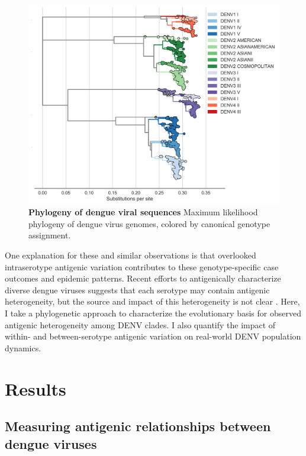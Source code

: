 \begin{figure}[ht!]
  \begin{centering}
    \includegraphics[width=\linewidth]{./png/genotype_tree.png}
  	\caption[Phylogeny of dengue viral sequences]{\textbf{Phylogeny of dengue viral sequences }
    Maximum likelihood phylogeny of dengue virus genomes, colored by canonical genotype assignment.
    }
  	\label{genotype_tree}
  \end{centering}
\end{figure}

One explanation for these and similar observations is that overlooked intraserotype antigenic variation contributes to these genotype-specific case outcomes and epidemic patterns.
Recent efforts to antigenically characterize diverse dengue viruses suggests that each serotype may contain antigenic heterogeneity, but the source and impact of this heterogeneity is not clear \citep{katzelnick2015dengue}.
Here, I take a phylogenetic approach to characterize the evolutionary basis for observed antigenic heterogeneity among DENV clades.
I also quantify the impact of within- and between-serotype antigenic variation on real-world DENV population dynamics.

\section{Results}
\subsection{Measuring antigenic relationships between dengue viruses}

